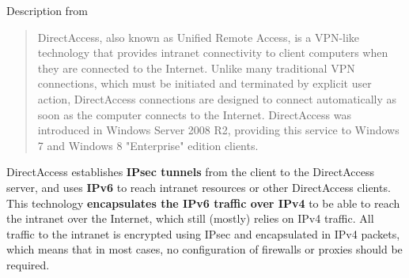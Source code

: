 \documentclass[Screen16to9,17pt]{foils}
\begin{document}

Description from 
\begin{quote}\small
DirectAccess, also known as Unified Remote Access, is a VPN-like technology that provides intranet connectivity to client computers when they are connected to the Internet. Unlike many traditional VPN connections, which must be initiated and terminated by explicit user action, DirectAccess connections are designed to connect automatically as soon as the computer connects to the Internet. DirectAccess was introduced in Windows Server 2008 R2, providing this service to Windows 7 and Windows 8 "Enterprise" edition clients.
\end{quote}

\begin{list2}
\item DirectAccess establishes {\bf IPsec tunnels} from the client to the DirectAccess server, and uses {\bf IPv6} to reach intranet resources or other DirectAccess clients. This technology {\bf encapsulates the IPv6 traffic over IPv4} to be able to reach the intranet over the Internet, which still (mostly) relies on IPv4 traffic. All traffic to the intranet is encrypted using IPsec and encapsulated in IPv4 packets, which means that in most cases, no configuration of firewalls or proxies should be required.
\end{list2}


\slidenext
\end{document}

